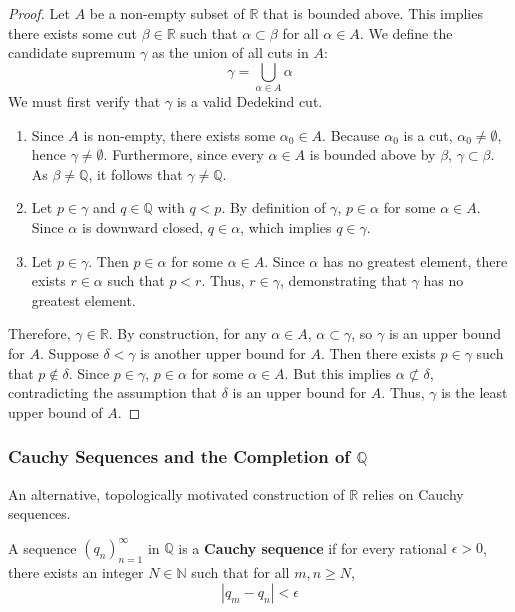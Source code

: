 \begin{proof}
Let $A$ be a non-empty subset of $\mathbb{R}$ that is bounded above. This implies there exists some cut $\beta \in \mathbb{R}$ such that $\alpha \subset \beta$ for all $\alpha \in A$. We define the candidate supremum $\gamma$ as the union of all cuts in $A$:
\[
\gamma = \bigcup_{\alpha \in A} \alpha
\]
We must first verify that $\gamma$ is a valid Dedekind cut.
\begin{enumerate}
    \item Since $A$ is non-empty, there exists some $\alpha_0 \in A$. Because $\alpha_0$ is a cut, $\alpha_0 \neq \emptyset$, hence $\gamma \neq \emptyset$. Furthermore, since every $\alpha \in A$ is bounded above by $\beta$, $\gamma \subset \beta$. As $\beta \neq \mathbb{Q}$, it follows that $\gamma \neq \mathbb{Q}$.
    \item Let $p \in \gamma$ and $q \in \mathbb{Q}$ with $q < p$. By definition of $\gamma$, $p \in \alpha$ for some $\alpha \in A$. Since $\alpha$ is downward closed, $q \in \alpha$, which implies $q \in \gamma$.
    \item Let $p \in \gamma$. Then $p \in \alpha$ for some $\alpha \in A$. Since $\alpha$ has no greatest element, there exists $r \in \alpha$ such that $p < r$. Thus, $r \in \gamma$, demonstrating that $\gamma$ has no greatest element.
\end{enumerate}
Therefore, $\gamma \in \mathbb{R}$. By construction, for any $\alpha \in A$, $\alpha \subset \gamma$, so $\gamma$ is an upper bound for $A$. Suppose $\delta < \gamma$ is another upper bound for $A$. Then there exists $p \in \gamma$ such that $p \notin \delta$. Since $p \in \gamma$, $p \in \alpha$ for some $\alpha \in A$. But this implies $\alpha \not\subset \delta$, contradicting the assumption that $\delta$ is an upper bound for $A$. Thus, $\gamma$ is the least upper bound of $A$.
\end{proof}

\subsubsection{Cauchy Sequences and the Completion of $\mathbb{Q}$}

An alternative, topologically motivated construction of $\mathbb{R}$ relies on Cauchy sequences.

\begin{definition}
A sequence $(q_n)_{n=1}^{\infty}$ in $\mathbb{Q}$ is a \textbf{Cauchy sequence} if for every rational $\epsilon > 0$, there exists an integer $N \in \mathbb{N}$ such that for all $m, n \ge N$,
\[
|q_m - q_n| < \epsilon
\]
\end{definition}

